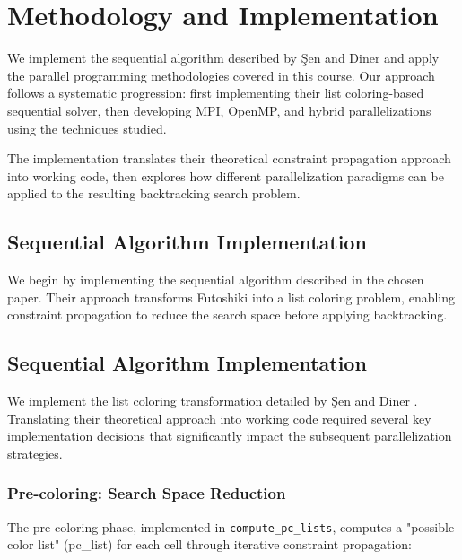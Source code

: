 \section{Methodology and Implementation}
\label{sec:solution}

We implement the sequential algorithm described by Şen and Diner \cite{Sen2024Futoshiki} and apply the parallel programming methodologies covered in this course. Our approach follows a systematic progression: first implementing their list coloring-based sequential solver, then developing MPI, OpenMP, and hybrid parallelizations using the techniques studied.

The implementation translates their theoretical constraint propagation approach into working code, then explores how different parallelization paradigms can be applied to the resulting backtracking search problem.

\subsection{Sequential Algorithm Implementation}
\label{subsec:paper_implementation}
We begin by implementing the sequential algorithm described in the chosen paper. Their approach transforms Futoshiki into a list coloring problem, enabling constraint propagation to reduce the search space before applying backtracking.

\subsection{Sequential Algorithm Implementation}
\label{subsec:paper_implementation}
We implement the list coloring transformation detailed by Şen and Diner \cite{Sen2024Futoshiki}. Translating their theoretical approach into working code required several key implementation decisions that significantly impact the subsequent parallelization strategies.

\subsubsection{Pre-coloring: Search Space Reduction}
\label{subsubsec:precoloring}
The pre-coloring phase, implemented in \texttt{compute\_pc\_lists}, computes a "possible color list" (pc\_list) for each cell through iterative constraint propagation:

